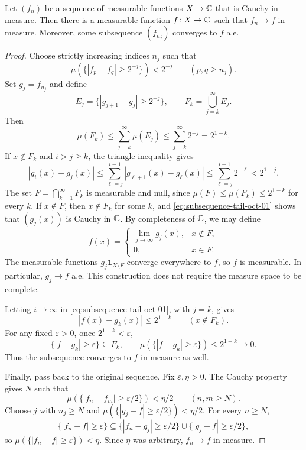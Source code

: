 \begin{theorem}\label{thm:cauchy-in-measure-oct-01}
  Let $(f_n)$ be a sequence of measurable functions $X\to\mathbb{C}$
  that is Cauchy in measure. Then there is a measurable function
  $f\colon X\to\mathbb{C}$ such that $f_n\to f$ in measure. Moreover, some
  subsequence $(f_{n_j})$ converges to $f$ a.e.
\end{theorem}

\begin{proof}
  Choose strictly increasing indices $n_j$ such that
  \[
    \mu(\{|f_p-f_q|\geq2^{-j}\})<2^{-j}
      \qquad(p,q\geq n_j).
  \]
  Set $g_j=f_{n_j}$ and define
  \[
    E_j=\{|g_{j+1}-g_j|\geq2^{-j}\},\qquad
    F_k=\bigcup_{j=k}^{\infty}E_j.
  \]
  Then
  \[
    \mu(F_k)\leq\sum_{j=k}^{\infty}\mu(E_j)
      \leq\sum_{j=k}^{\infty}2^{-j}=2^{1-k}.
  \]
  If $x\notin F_k$ and $i>j\geq k$, the triangle inequality gives
  \begin{equation}\label{eq:subsequence-tail-oct-01}
    |g_i(x)-g_j(x)|
      \leq\sum_{\ell=j}^{i-1}|g_{\ell+1}(x)-g_\ell(x)|
      \leq\sum_{\ell=j}^{i-1}2^{-\ell}
      <2^{1-j}.
  \end{equation}
  The set $F=\bigcap_{k=1}^{\infty}F_k$ is measurable and null,
  since $\mu(F)\leq\mu(F_k)\leq2^{1-k}$ for every $k$.
  If $x\notin F$, then $x\notin F_k$ for some $k$, and
  \eqref{eq:subsequence-tail-oct-01} shows that $(g_j(x))$ is Cauchy
  in $\mathbb{C}$. By completeness of $\mathbb{C}$, we may define
  \[
    f(x)=
    \begin{cases}
      \displaystyle\lim_{j\to\infty}g_j(x),&x\notin F,\\
      0,&x\in F.
    \end{cases}
  \]
  The measurable functions $g_j\mathbf 1_{X\setminus F}$ converge
  everywhere to $f$, so $f$ is measurable. In particular,
  $g_j\to f$ a.e. This construction does not require the measure
  space to be complete.

  Letting $i\to\infty$ in
  \eqref{eq:subsequence-tail-oct-01}, with $j=k$, gives
  \[
    |f(x)-g_k(x)|\leq2^{1-k}\qquad(x\notin F_k).
  \]
  For any fixed $\varepsilon>0$, once $2^{1-k}<\varepsilon$,
  \[
    \{|f-g_k|\geq\varepsilon\}\subseteq F_k,
    \qquad
    \mu(\{|f-g_k|\geq\varepsilon\})\leq2^{1-k}\longrightarrow0.
  \]
  Thus the subsequence converges to $f$ in measure as well.

  Finally, pass back to the original sequence. Fix
  $\varepsilon,\eta>0$. The Cauchy property gives $N$ such that
  \[
    \mu(\{|f_n-f_m|\geq\varepsilon/2\})<\eta/2
      \qquad(n,m\geq N).
  \]
  Choose $j$ with $n_j\geq N$ and
  $\mu(\{|g_j-f|\geq\varepsilon/2\})<\eta/2$. For every $n\geq N$,
  \[
    \{|f_n-f|\geq\varepsilon\}
      \subseteq\{|f_n-g_j|\geq\varepsilon/2\}
        \cup\{|g_j-f|\geq\varepsilon/2\},
  \]
  so $\mu(\{|f_n-f|\geq\varepsilon\})<\eta$. Since $\eta$ was
  arbitrary, $f_n\to f$ in measure.
\end{proof}

\FloatBarrier

